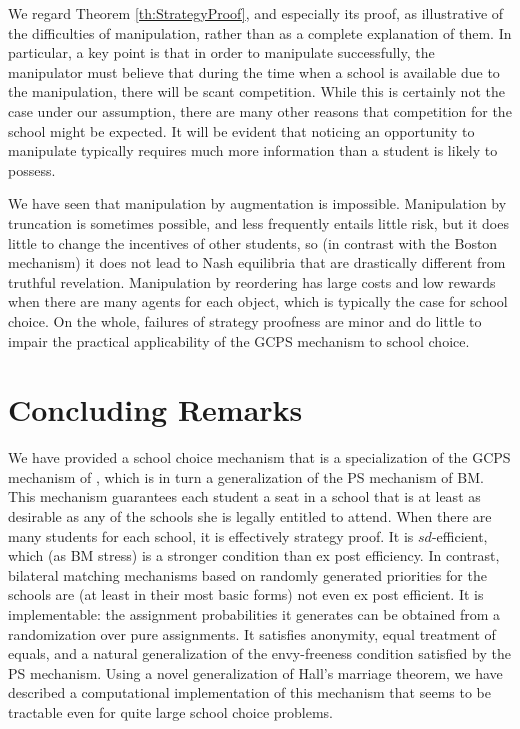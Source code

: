 \documentclass[12pt]{article}
\theoremstyle{definition}
\begin{document}
We regard Theorem \ref{th:StrategyProof}, and especially its proof, as illustrative of the difficulties of manipulation, rather than as a complete explanation of them.  In particular, a key point is that in order to manipulate successfully, the manipulator must believe that during the time when a school is available due to the manipulation, there will be scant competition.  While this is certainly not the case under our assumption, there are many other reasons that competition for the school might be expected.   It will be evident that noticing an opportunity to manipulate typically requires much more information than a student is likely to possess. 

We have seen that manipulation by augmentation is impossible.  Manipulation by truncation is sometimes possible, and less frequently entails little risk, but it does little to change the incentives of other students, so (in contrast with the Boston mechanism) it does not lead to Nash equilibria that are drastically different from truthful revelation.  Manipulation by reordering has large costs and low rewards when there are many agents for each object, which is typically the case for school choice.  On the whole, failures of strategy proofness are minor and do little to impair the practical applicability of the GCPS mechanism to school choice.

\section{Concluding Remarks} \label{sec:Conclusion}

We have provided a school choice mechanism that is a specialization of the GCPS mechanism of \cite{balbuzanov22jet}, which is in turn a generalization of the PS mechanism of BM.  This mechanism guarantees each student a seat in a school that is at least as desirable as any of the schools she is legally entitled to attend.  When there are many students for each school, it is effectively strategy proof.  It is $sd$-efficient, which (as BM stress) is a stronger condition than ex post efficiency.  In contrast, bilateral matching mechanisms based on randomly generated priorities for the schools are (at least in their most basic forms) not even ex post efficient.  It is implementable: the assignment probabilities it generates can be obtained from a randomization over pure assignments.  It satisfies anonymity, equal treatment of equals, and a natural generalization of the envy-freeness condition satisfied by the PS mechanism.
Using a novel generalization of Hall's marriage theorem, we have described a computational implementation of this mechanism that seems to be tractable even for quite large school choice problems. 
\end{document}
